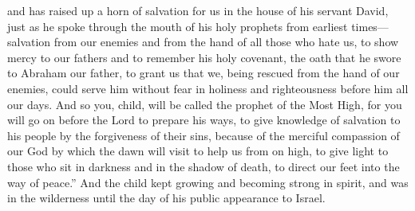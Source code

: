 \begin{biblechapter}
\verse and has raised up a horn of salvation for us 
in the house of his servant David,
\verse just as he spoke through the mouth of his holy prophets from earliest times—
\verse salvation from our enemies and from the hand of all those who hate us,
\verse to show mercy to our fathers 
and to remember his holy covenant,
\verse the oath that he swore to Abraham our father, 
to grant us
\verse that we, being rescued from the hand of our enemies, 
could serve him without fear
\verse in holiness and righteousness 
before him all our days.
\verse And so you, child, will be called the prophet of the Most High, 
for you will go on before the Lord to prepare his ways,
\verse to give knowledge of salvation to his people 
by the forgiveness of their sins,
\verse because of the merciful compassion of our God 
by which the dawn will visit to help us from on high,
\verse to give light to those who sit in darkness and in the shadow of death, 
to direct our feet into the way of peace.”
\verse And the child kept growing and becoming strong in spirit, and was in the wilderness until the day of his public appearance to Israel.
\end{biblechapter}

